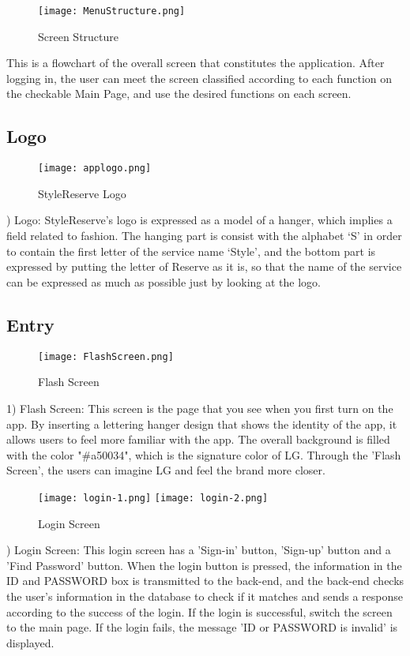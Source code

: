 \documentclass[conference]{IEEEtran}
\begin{document}
\begin{figure}[htbp]
\centerline{\texttt{[image: MenuStructure.png]}}
\caption{Screen Structure}
\label{fig}
\end{figure}
This is a flowchart of the overall screen that constitutes the application. After logging in, the user can meet the screen classified according to each function on the checkable Main Page, and use the desired functions on each screen.\\

\subsection{Logo}
\begin{figure}[htbp]
\centerline{\texttt{[image: applogo.png]}}
\caption{StyleReserve Logo}
\label{fig}
\end{figure}
) Logo: StyleReserve's logo is expressed as a model of a hanger, which implies a field related to fashion. The hanging part is consist with the alphabet ‘S’ in order to contain the first letter of the service name ‘Style’, and the bottom part is expressed by putting the letter of Reserve as it is, so that the name of the service can be expressed as much as possible just by looking at the logo.\\

\subsection{Entry}
\begin{figure}[htbp]
\centerline{\texttt{[image: FlashScreen.png]}}
\caption{Flash Screen}
\label{fig}
\end{figure}
1) Flash Screen: This screen is the page that you see when you first turn on the app. By inserting a lettering hanger design that shows the identity of the app, it allows users to feel more familiar with the app. The overall background is filled with the color "#a50034", which is the signature color of LG. Through the 'Flash Screen', the users can imagine LG and feel the brand more closer.\\

\begin{figure}[htbp]
\centerline{
\texttt{[image: login-1.png]}
\texttt{[image: login-2.png]}
}
\caption{Login Screen}
\label{fig}
\end{figure}
) Login Screen: This login screen has a 'Sign-in' button, 'Sign-up' button and a 'Find Password' button. When the login button is pressed, the information in the ID and PASSWORD box is transmitted to the back-end, and the back-end checks the user's information in the database to check if it matches and sends a response according to the success of the login. If the login is successful, switch the screen to the main page. If the login fails, the message 'ID or PASSWORD is invalid' is displayed.\\
\end{document}
